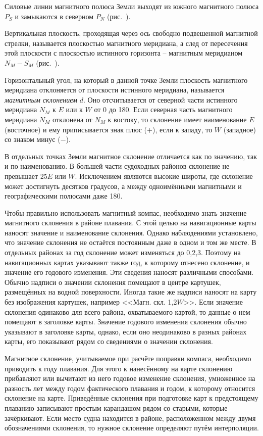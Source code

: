 Силовые линии магнитного полюса Земли выходят из южного магнитного
полюса $P_S$ и замыкаются в северном $P_N$ (рис.~).

Вертикальная плоскость, проходящая через ось свободно подвешенной
магнитной стрелки, называется плоскостью магнитного меридиана, а след
от пересечения этой плоскости с плоскостью истинного горизонта \---
магнитным меридианом $N_M - S_M$ (рис.~).

Горизонтальный угол, на который в данной точке Земли плоскость
магнитного меридиана отклоняется от плоскости истинного меридиана,
называется \textit{магнитным склонением}
$d$. Оно отсчитывается от северной части истинного меридиана $N_M$ к
$E$ или к $W$ от 0 до 180\gr. Если северная часть магнитного меридиана
$N_M$ отклонена от $N_M$ к востоку, то склонение имеет наименование
$E$ (восточное) и ему приписывается знак плюс ($+$), если к западу, то
$W$ (западное) со знаком минус ($-$).

В отдельных точках Земли магнитное склонение отличается как по
значению, так и по наименованию. В большей части судоходных районов
склонение не превышает 25\gr $E$ или $W$. Исключением являются высокие
широты, где склонение может достигнуть десятков градусов, а между
одноимёнными магнитными и географическими полюсами даже 180\gr.

Чтобы правильно использовать магнитный компас, необходимо знать
значение магнитного склонения в районе плавания. С этой целью на
навигационные карты наносят значение и наименование склонения. Однако
наблюдениями установлено, что значение склонения не остаётся
постоянным даже в одном и том же месте. В отдельных районах за год
склонение может изменяться до 0,2,3\gr. Поэтому на
навигационных картах указывают также год, к которому отнесено
склонение, и значение его годового изменения. Эти сведения наносят
различными способами. Обычно надписи о значении склонения помещают в
центре картушек, размещённых на водной поверхности. Иногда такие же
надписи наносят на карту без изображения картушек, например
<<Магн. скл. 1,2\gr $W$>>. Если значение склонения одинаково для всего
района, охватываемого картой, то данные о нем помещают в заголовке
карты. Значение годового изменения склонения обычно указывают в
заголовке карты, однако, если оно неодинаково в разных районах карты,
его показывают рядом со сведениями о значении склонения.

Магнитное склонение, учитываемое при расчёте поправки компаса,
необходимо приводить к году плавания. Для этого к нанесённому на карте
склонению прибавляют или вычитают из него годовое изменение склонения,
умноженное на разность лет между годом фактического плавания и годом,
к которому относится склонение на карте. Приведённые склонения при
подготовке карт к предстоящему плаванию записывают простым карандашом
рядом со старыми, которые зачёркивают. Если место судна находится в
районе, расположенном между двумя обозначениями склонения, то нужное
склонение определяют путём интерполяции.

